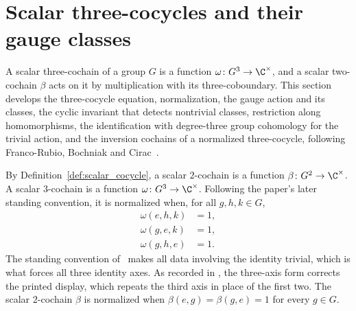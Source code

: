 \section{Scalar three-cocycles and their gauge classes}
\label{sec:threecocycle_cochains}

A scalar three-cochain of a group $G$ is a function
$\omega\colon G^3\to\C^\times$, and a scalar two-cochain $\beta$ acts on it by
multiplication with its three-coboundary. This section develops the
three-cocycle equation, normalization, the gauge action and its classes, the
cyclic invariant that detects nontrivial classes, restriction along
homomorphisms, the identification with degree-three group cohomology for the
trivial action, and the inversion cochains of a normalized three-cocycle,
following Franco-Rubio, Bochniak and Cirac~\cite{FrancoRubio2025MPUGauging}.

\begin{definition}
    \label{def:mpug_scalar_cochains}
    \leanok
    By Definition~\ref{def:scalar_cocycle}, a scalar $2$-cochain
    is a function $\beta\colon G^2\to\C^\times$. A scalar $3$-cochain is a
    function $\omega\colon G^3\to\C^\times$. Following the paper's later
    standing convention, it is normalized when, for all $g,h,k\in G$,
    \begin{align}
        \omega(e,h,k) & = 1, \\
        \omega(g,e,k) & = 1, \\
        \omega(g,h,e) & = 1.
        \label{eq:mpug_three_normalized}
    \end{align}
    The standing convention of~\cite{FrancoRubio2025MPUGauging} makes all
    data involving the identity trivial, which is what forces all three
    identity axes. As recorded in
    \cite{gap:fbc25_three_cocycle_normalization_typo}, the three-axis form
    corrects the printed display, which repeats the third axis in place of
    the first two.
    The scalar $2$-cochain $\beta$ is normalized when
    $\beta(e,g)=\beta(g,e)=1$ for every $g\in G$.
\end{definition}

